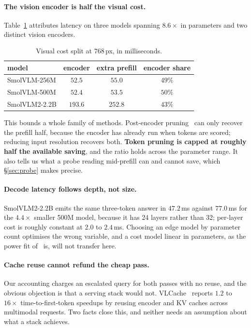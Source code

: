 \documentclass[10pt,twocolumn]{article}
\theoremstyle{plain}
\begin{document}
\paragraph{The vision encoder is half the visual cost.} Table~\ref{tab:components}
attributes latency on three models spanning $8.6\times$ in parameters and two
distinct vision encoders.

\begin{table}[h]
\centering\small
\begin{tabular}{lccc}
\toprule
model & encoder & extra prefill & encoder share \\
\midrule
SmolVLM-256M  & $52.5$ & $55.0$ & $49\%$ \\
SmolVLM-500M  & $52.4$ & $53.5$ & $50\%$ \\
SmolVLM2-2.2B & $193.6$ & $252.8$ & $43\%$ \\
\bottomrule
\end{tabular}
\caption{Visual cost split at $768$\,px, in milliseconds.}
\label{tab:components}
\end{table}

This bounds a whole family of methods. Post-encoder pruning~\cite{glimpseprune}
can only recover the prefill half, because the encoder has already run when
tokens are scored; reducing input resolution recovers both. \textbf{Token
pruning is capped at roughly half the available saving}, and the ratio holds
across the parameter range. It also tells us what a probe reading mid-prefill
can and cannot save, which \S\ref{sec:probe} makes precise.

\paragraph{Decode latency follows depth, not size.} SmolVLM2-2.2B emits the same
three-token answer in $47.2$\,ms against $77.0$\,ms for the $4.4\times$ smaller
500M model, because it has 24 layers rather than 32; per-layer cost is roughly
constant at $2.0$ to $2.4$\,ms. Choosing an edge model by parameter count
optimises the wrong variable, and a cost model linear in parameters, as the power fit of~\cite{energy} is, will not transfer here.

\paragraph{Cache reuse cannot refund the cheap pass.} Our accounting charges an
escalated query for both passes with no reuse, and the obvious objection is that
a serving stack would not. VLCache~\cite{vlcache} reports $1.2$ to $16\times$
time-to-first-token speedups by reusing encoder and KV caches across multimodal
requests. Two facts close this, and neither needs an assumption about what a
stack achieves.
\end{document}

